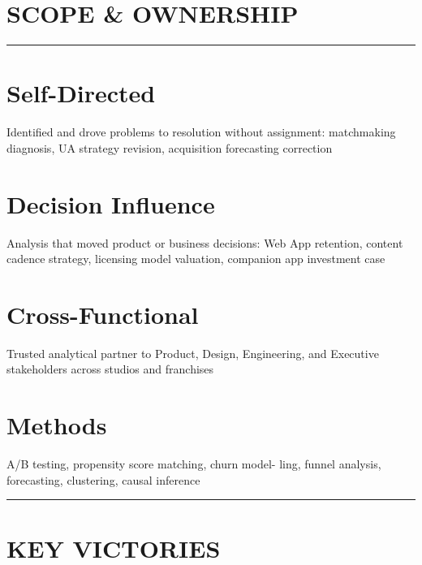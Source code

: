 %

\section{SCOPE \& OWNERSHIP}
\vspace{-0.1cm}%
\noindent\rule{\textwidth}{0.4pt}
\vspace{-0.1cm}%
%
\section{\large Self-Directed}
Identified and drove problems to resolution without assignment: matchmaking diagnosis, UA strategy revision, acquisition forecasting correction
~
\section{\large Decision Influence}
Analysis that moved product or business decisions: Web App retention, content cadence strategy, licensing model valuation, companion app investment case
~
\section{\large Cross-Functional}
Trusted analytical partner to Product, Design, Engineering, and Executive stakeholders across studios and franchises
~
\section{\large Methods}
A/B testing, propensity score matching, churn model- ling, funnel analysis, forecasting, clustering, causal inference
%
\noindent\rule{\textwidth}{0.4pt}%
\vspace{-0.1cm}%
%
\section{KEY VICTORIES}
\vspace{-0.25cm}
%
%
